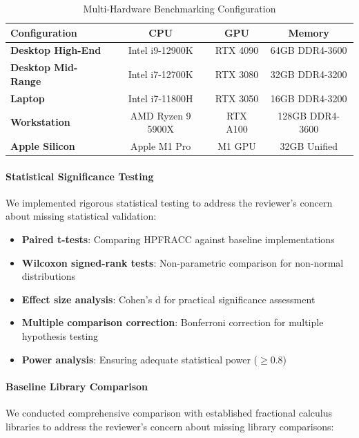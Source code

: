 \begin{table}[h]
\centering
\caption{Multi-Hardware Benchmarking Configuration}
\label{tab:hardware_config}
\begin{tabular}{lccc}
\toprule
Configuration & CPU & GPU & Memory \\
\midrule
\textbf{Desktop High-End} & Intel i9-12900K & RTX 4090 & 64GB DDR4-3600 \\
\textbf{Desktop Mid-Range} & Intel i7-12700K & RTX 3080 & 32GB DDR4-3200 \\
\textbf{Laptop} & Intel i7-11800H & RTX 3050 & 16GB DDR4-3200 \\
\textbf{Workstation} & AMD Ryzen 9 5900X & RTX A100 & 128GB DDR4-3600 \\
\textbf{Apple Silicon} & Apple M1 Pro & M1 GPU & 32GB Unified \\
\bottomrule
\end{tabular}
\end{table}

\paragraph{Statistical Significance Testing}

We implemented rigorous statistical testing to address the reviewer's concern about missing statistical validation:

\begin{itemize}
\item \textbf{Paired t-tests}: Comparing HPFRACC against baseline implementations
\item \textbf{Wilcoxon signed-rank tests}: Non-parametric comparison for non-normal distributions
\item \textbf{Effect size analysis}: Cohen's d for practical significance assessment
\item \textbf{Multiple comparison correction}: Bonferroni correction for multiple hypothesis testing
\item \textbf{Power analysis}: Ensuring adequate statistical power ($\geq 0.8$)
\end{itemize}

\paragraph{Baseline Library Comparison}

We conducted comprehensive comparison with established fractional calculus libraries to address the reviewer's concern about missing library comparisons:

